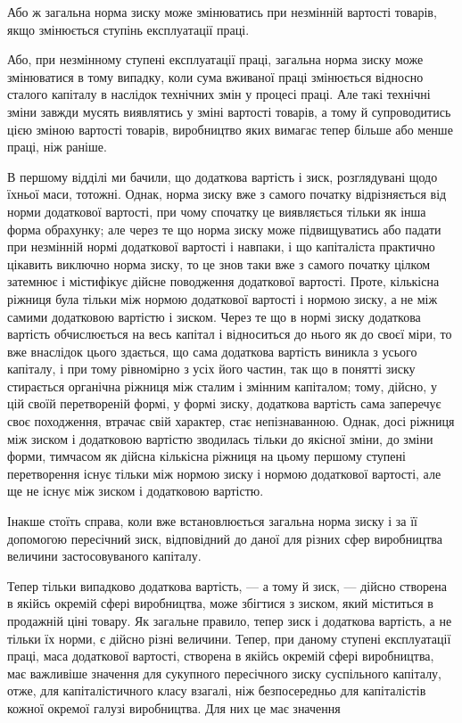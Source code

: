 Або ж загальна норма зиску може змінюватись при незмінній вартості товарів, якщо змінюється ступінь
експлуатації праці.

Або, при незмінному ступені експлуатації праці, загальна
норма зиску може змінюватися в тому випадку, коли сума вживаної праці змінюється відносно сталого
капіталу в наслідок
технічних змін у процесі праці. Але такі технічні зміни завжди
мусять виявлятись у зміні вартості товарів, а тому й супроводитись цією зміною вартості товарів,
виробництво яких вимагає
тепер більше або менше праці, ніж раніше.

В першому відділі ми бачили, що додаткова вартість і зиск,
розглядувані щодо їхньої маси, тотожні. Однак, норма зиску вже
з самого початку відрізняється від норми додаткової вартості,
при чому спочатку це виявляється тільки як інша форма обрахунку; але через те що норма зиску може
підвищуватись або
падати при незмінній нормі додаткової вартості і навпаки, і що
капіталіста практично цікавить виключно норма зиску, то це
знов таки вже з самого початку цілком затемнює і містифікує
дійсне поводження додаткової вартості. Проте, кількісна ріжниця
була тільки між нормою додаткової вартості і нормою зиску,
а не між самими додатковою вартістю і зиском. Через те що
в нормі зиску додаткова вартість обчислюється на весь капітал
і відноситься до нього як до своєї міри, то вже внаслідок
цього здається, що сама додаткова вартість виникла з усього
капіталу, і при тому рівномірно з усіх його частин, так що
в понятті зиску стирається органічна ріжниця між сталим і змінним капіталом; тому, дійсно, у цій
своїй перетвореній формі,
у формі зиску, додаткова вартість сама заперечує своє походження, втрачає свій характер, стає
непізнаванною. Однак, досі
ріжниця між зиском і додатковою вартістю зводилась тільки до
якісної зміни, до зміни форми, тимчасом як дійсна кількісна
ріжниця на цьому першому ступені перетворення існує тільки
між нормою зиску і нормою додаткової вартості, але ще не існує
між зиском і додатковою вартістю.

Інакше стоїть справа, коли вже встановлюється загальна
норма зиску і за її допомогою пересічний зиск, відповідний до
даної для різних сфер виробництва величини застосовуваного
капіталу.

Тепер тільки випадково додаткова вартість, — а тому й зиск, — дійсно створена в якійсь окремій сфері
виробництва, може збігтися з зиском, який міститься в продажній ціні товару. Як загальне правило,
тепер зиск і додаткова вартість, а не тільки їх
норми, є дійсно різні величини. Тепер, при даному ступені
експлуатації праці, маса додаткової вартості, створена в якійсь
окремій сфері виробництва, має важливіше значення для сукупного пересічного зиску суспільного
капіталу, отже, для капіталістичного класу взагалі, ніж безпосередньо для капіталістів кожної
окремої галузі виробництва. Для них це має значення
\parbreak{}  %
